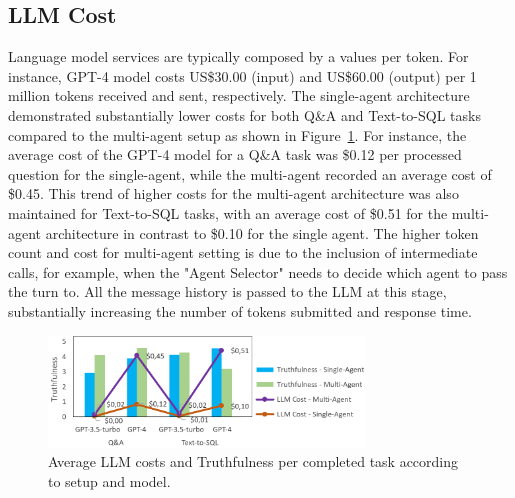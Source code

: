         
            
        
        \subsection{LLM Cost} 
            Language model services are typically composed by a values per token. For instance, GPT-4 model costs US\$30.00 (input) and US\$60.00 (output) per 1 million tokens received and sent, respectively.        
            The single-agent architecture demonstrated substantially lower costs for both Q\&A and Text-to-SQL tasks compared to the multi-agent setup as shown in Figure~\ref{fig:truthfulness_vs_cost_vs_config_model}. For instance, the average cost of the GPT-4 model \cite{OpenAI2023} for a Q\&A task was \$0.12 per processed question for the single-agent, while the multi-agent recorded an average cost of \$0.45. This trend of higher costs for the multi-agent architecture was also maintained for Text-to-SQL tasks, with an average cost of \$0.51 for the multi-agent architecture in contrast to \$0.10 for the single agent.
            The higher token count and cost for multi-agent setting is due to the inclusion of intermediate calls, for example, when the "Agent Selector" needs to decide which agent to pass the turn to. All the message history is passed to the LLM at this stage, substantially increasing the number of tokens submitted and response time.
        

            \begin{figure}[h]
                \centering              
                    \includegraphics[width=0.75\textwidth]{images/truthfulness_vs_cost_vs_config_model.png}
                \caption{Average LLM costs and Truthfulness per completed task according to setup and model.}
                \label{fig:truthfulness_vs_cost_vs_config_model}
            \end{figure}
            
